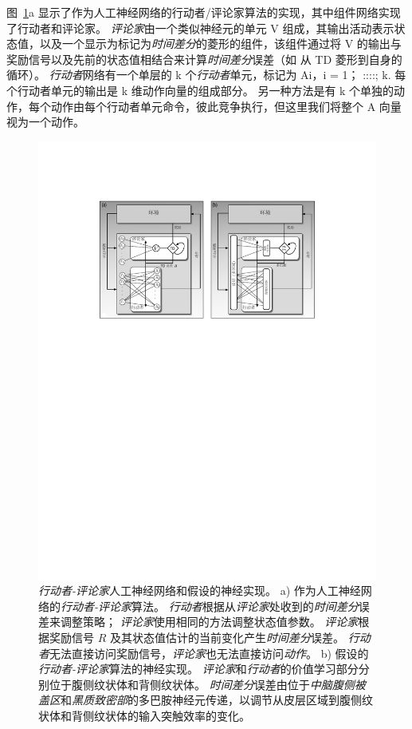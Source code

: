 图~\ref{fig:12_6}a 显示了作为人工神经网络的行动者/评论家算法的实现，其中组件网络实现了行动者和评论家。
\textit{评论家}由一个类似神经元的单元 V 组成，其输出活动表示状态值，以及一个显示为标记为\textit{时间差分}的菱形的组件，该组件通过将 V 的输出与奖励信号以及先前的状态值相结合来计算\textit{时间差分}误差（如 从 TD 菱形到自身的循环）。
\textit{行动者}网络有一个单层的 k 个\textit{行动者}单元，标记为 Ai，i = 1； ::::; k. 每个行动者单元的输出是 k 维动作向量的组成部分。 
另一种方法是有 k 个单独的动作，每个动作由每个行动者单元命令，彼此竞争执行，但这里我们将整个 A 向量视为一个动作。


\begin{figure}[!htb]
	\centering
	\includegraphics[width=0.8\linewidth]{chap12/fig_12_6}
	\caption{\textit{行动者-评论家}人工神经网络和假设的神经实现。
		a) 作为人工神经网络的\textit{行动者-评论家}算法。
			\textit{行动者}根据从\textit{评论家}处收到的\textit{时间差分}误差来调整策略；
			\textit{评论家}使用相同的方法调整状态值参数。
			\textit{评论家}根据奖励信号 $R$ 及其状态值估计的当前变化产生\textit{时间差分}误差。
			\textit{行动者}无法直接访问奖励信号，\textit{评论家}也无法直接访问\textit{动作}。
			b) 假设的\textit{行动者-评论家}算法的神经实现。
			\textit{评论家}和\textit{行动者}的价值学习部分分别位于腹侧纹状体和背侧纹状体。
			\textit{时间差分}误差由位于\textit{中脑腹侧被盖区}和\textit{黑质致密部}的多巴胺神经元传递，以调节从皮层区域到腹侧纹状体和背侧纹状体的输入突触效率的变化\cite{takahashi2008silencing}。
		\label{fig:12_6}}
\end{figure}


